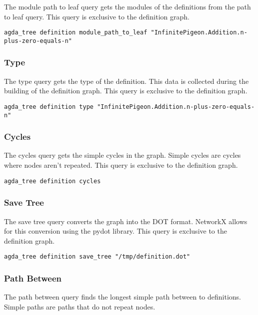 The module path to leaf query gets the modules of the definitions from the path
to leaf query. This query is exclusive to the definition graph.

\begin{lstlisting}
agda_tree definition module_path_to_leaf "InfinitePigeon.Addition.n-plus-zero-equals-n"
\end{lstlisting}

\subsubsection{Type}

The type query gets the type of the definition. This data is collected during
the building of the definition graph. This query is exclusive to the definition
graph. 

\begin{lstlisting}
agda_tree definition type "InfinitePigeon.Addition.n-plus-zero-equals-n"
\end{lstlisting}

\subsubsection{Cycles}

The cycles query gets the simple cycles in the graph. Simple cycles are cycles
where nodes aren't repeated. This query is exclusive to the definition graph. 

\begin{lstlisting}
agda_tree definition cycles
\end{lstlisting}

\subsubsection{Save Tree}

The save tree query converts the graph into the DOT format. NetworkX allows for
this conversion using the pydot library. This query is exclusive to the
definition graph. 

\begin{lstlisting}
agda_tree definition save_tree "/tmp/definition.dot"
\end{lstlisting}

\subsubsection{Path Between}

The path between query finds the longest simple path between to definitions.
Simple paths are paths that do not repeat nodes. 

